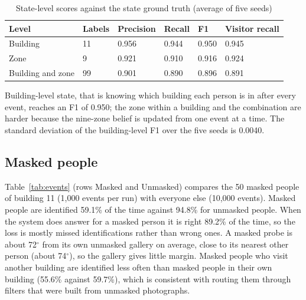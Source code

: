 \documentclass[12pt,a4paper,oneside]{report}
\begin{document}
\begin{table}[htbp]
\centering
\caption{State-level scores against the state ground truth (average of five seeds)}\label{tab:state}
{\small\setlength{\tabcolsep}{4pt}\renewcommand{\arraystretch}{1.2}
\begin{tabular}{|p{3.30cm}|p{1.74cm}|p{2.33cm}|p{1.94cm}|p{1.55cm}|p{2.52cm}|}\hline
\textbf{Level} & \textbf{Labels} & \textbf{Precision} & \textbf{Recall} & \textbf{F1} & \textbf{Visitor recall}\\\hline
Building & 11 & 0.956 & 0.944 & 0.950 & 0.945\\\hline
Zone & 9 & 0.921 & 0.910 & 0.916 & 0.924\\\hline
Building and zone & 99 & 0.901 & 0.890 & 0.896 & 0.891\\\hline
\end{tabular}}
\end{table}



Building-level state, that is knowing which building each person is in after every event, reaches an F1 of 0.950; the zone within a building and the combination are harder because the nine-zone belief is updated from one event at a time. The standard deviation of the building-level F1 over the five seeds is 0.0040.

\subsection{Masked people}\label{sec:res-masked}
Table~\ref{tab:events} (rows Masked and Unmasked) compares the 50 masked people of building 11 (1,000 events per run) with everyone else (10,000 events). Masked people are identified 59.1\% of the time against 94.8\% for unmasked people. When the system does answer for a masked person it is right 89.2\% of the time, so the loss is mostly missed identifications rather than wrong ones. A masked probe is about 72$^{\circ}$ from its own unmasked gallery on average, close to its nearest other person (about 74$^{\circ}$), so the gallery gives little margin. Masked people who visit another building are identified less often than masked people in their own building (55.6\% against 59.7\%), which is consistent with routing them through filters that were built from unmasked photographs.
\end{document}
